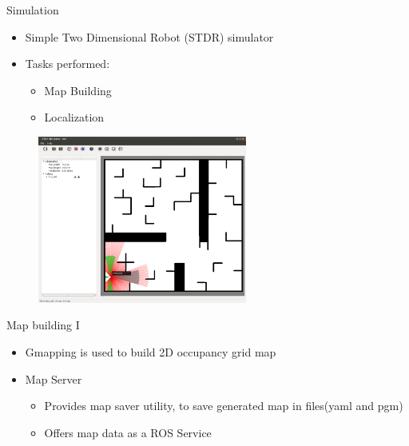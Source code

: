 

\begin{frame}{Simulation}
    \begin{itemize}
        \item Simple Two Dimensional Robot (STDR) simulator	
        \item Tasks  performed:
        \begin{itemize}
            \item Map Building
            \item Localization
        \end{itemize}
    \end{itemize}
    
    \centering
    \includegraphics[width=90mm,height=55mm]{gfx/stdr_simulator}
    
\end{frame}
\begin{frame}{Map building I}
    \begin{itemize}
        \item Gmapping is used to build 2D occupancy grid map 

        \item Map Server
        \begin{itemize}
            \item Provides map saver utility, to save generated map in files(yaml and pgm)
            \item Offers map data as a ROS Service
        \end{itemize}
        
    \end{itemize}
\end{frame}
